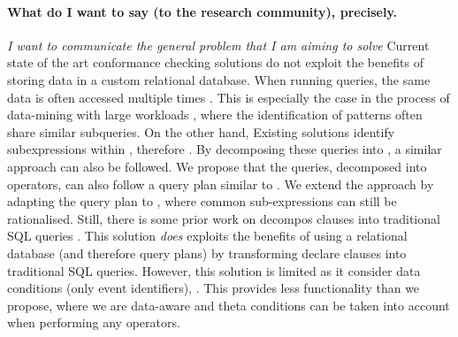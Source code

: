 \paragraph*{What do I want to say (to the research community), precisely.} \textit{I want to communicate the general problem that I am aiming to solve} 
Current state of the art conformance checking solutions do not exploit the benefits of storing data in a custom relational database. When running queries, the same data is often accessed multiple times \cite{BurattinMS16,bpm21}. This is especially the case in the process of data-mining with large workloads \cite{SchonigRCJM16}, where the identification of patterns often share similar subqueries. On the other hand, Existing solutions  \cite{BellatrecheKB21} identify  sub\RevAdd{-}expressions within , therefore  . By decomposing these queries into \LTLf, a similar approach can also be followed. We propose that the queries, decomposed into \LTLf operators, can also follow a query plan similar to \cite{BellatrecheKB21}. We extend the approach by adapting the query plan to , where common sub-expressions can still be rationalised. Still, there is some prior work on  decompos clauses into traditional SQL queries \cite{SchonigRCJM16}. This solution \emph{does} exploits the benefits of using a relational database (and therefore query plans) by transforming declare clauses into traditional SQL queries. However, this solution is limited as it  consider data conditions (only event identifiers), . This provides less functionality than we propose, where we are data-aware and theta conditions can be taken into account when performing any operators.



